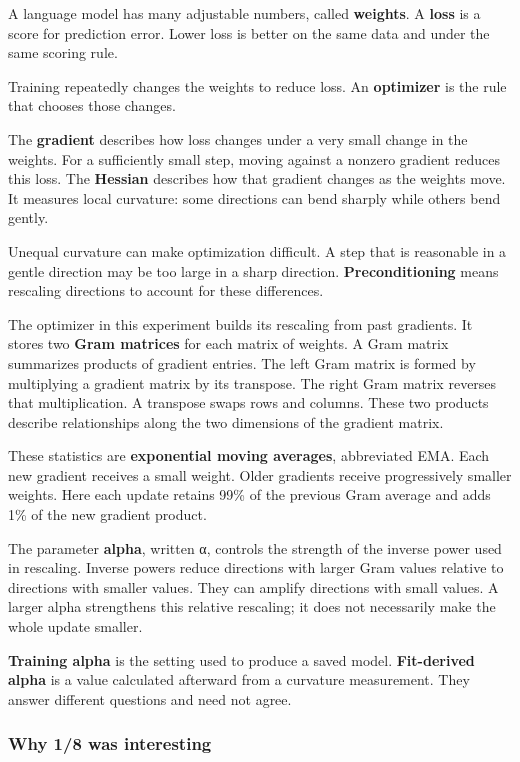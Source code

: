 \documentclass[
  14pt,
  letterpaper,
]{extarticle}
\begin{document}
A language model has many adjustable numbers, called \textbf{weights}. A
\textbf{loss} is a score for prediction error. Lower loss is better on
the same data and under the same scoring rule.

Training repeatedly changes the weights to reduce loss. An
\textbf{optimizer} is the rule that chooses those changes.

The \textbf{gradient} describes how loss changes under a very small
change in the weights. For a sufficiently small step, moving against a
nonzero gradient reduces this loss. The \textbf{Hessian} describes how
that gradient changes as the weights move. It measures local curvature:
some directions can bend sharply while others bend gently.

Unequal curvature can make optimization difficult. A step that is
reasonable in a gentle direction may be too large in a sharp direction.
\textbf{Preconditioning} means rescaling directions to account for these
differences.

The optimizer in this experiment builds its rescaling from past
gradients. It stores two \textbf{Gram matrices} for each matrix of
weights. A Gram matrix summarizes products of gradient entries. The left
Gram matrix is formed by multiplying a gradient matrix by its transpose.
The right Gram matrix reverses that multiplication. A transpose swaps
rows and columns. These two products describe relationships along the
two dimensions of the gradient matrix.

These statistics are \textbf{exponential moving averages}, abbreviated
EMA. Each new gradient receives a small weight. Older gradients receive
progressively smaller weights. Here each update retains 99\% of the
previous Gram average and adds 1\% of the new gradient product.

The parameter \textbf{alpha}, written α, controls the strength of the
inverse power used in rescaling. Inverse powers reduce directions with
larger Gram values relative to directions with smaller values. They can
amplify directions with small values. A larger alpha strengthens this
relative rescaling; it does not necessarily make the whole update
smaller.

\textbf{Training alpha} is the setting used to produce a saved model.
\textbf{Fit-derived alpha} is a value calculated afterward from a
curvature measurement. They answer different questions and need not
agree.

\subsubsection{Why 1/8 was interesting}\label{why-18-was-interesting}
\end{document}
